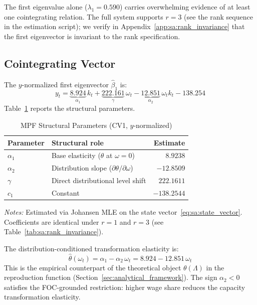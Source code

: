The first eigenvalue alone ($\lambda_1 = 0.590$) carries overwhelming
evidence of at least one cointegrating relation. The full system supports
$r = 3$ (see the rank sequence in the estimation script); we verify in
Appendix~\ref{app:sa:rank_invariance} that the first eigenvector is
invariant to the rank specification.


\subsection{Cointegrating Vector}
\label{app:sa:cv1}

The $y$-normalized first eigenvector $\hat{\beta}_1$ is:
%
\begin{equation}
    y_t = \underbrace{8.924}_{\alpha_1}\, k_t
        + \underbrace{222.161}_{\gamma}\, \omega_t
        - \underbrace{12.851}_{\alpha_2}\, \omega_t k_t
        - 138.254
    \label{eq:sa:cv1}
\end{equation}
%
Table~\ref{tab:sa:cv1_params} reports the structural parameters.

\begin{table}[htbp]
\centering
\caption{MPF Structural Parameters (CV1, $y$-normalized)}
\label{tab:sa:cv1_params}
\begin{threeparttable}
\begin{tabular}{llr}
\toprule
Parameter & Structural role & Estimate \\
\midrule
$\alpha_1$ & Base elasticity ($\theta$ at $\omega = 0$) & $8.9238$ \\
$\alpha_2$ & Distribution slope ($\partial\theta / \partial\omega$) & $-12.8509$ \\
$\gamma$   & Direct distributional level shift & $222.1611$ \\
$c_1$      & Constant & $-138.2544$ \\
\bottomrule
\end{tabular}
\begin{tablenotes}
\small
\item \textit{Notes:} Estimated via Johansen MLE on the state
vector~\eqref{eq:sa:state_vector}. Coefficients are identical under
$r=1$ and $r=3$ (see Table~\ref{tab:sa:rank_invariance}).
\end{tablenotes}
\end{threeparttable}
\end{table}

The distribution-conditioned transformation elasticity is:
%
\begin{equation}
    \boxed{\hat{\theta}(\omega_t) = \alpha_1 - \alpha_2\,\omega_t
        = 8.924 - 12.851\,\omega_t}
    \label{eq:sa:theta_omega}
\end{equation}
%
This is the empirical counterpart of the theoretical object
$\theta(\Lambda)$ in the reproduction function
(Section~\ref{sec:analytical_framework}). The sign $\alpha_2 < 0$
satisfies the FOC-grounded restriction: higher wage share reduces the
capacity transformation elasticity.



